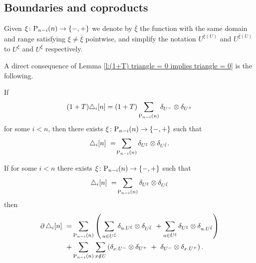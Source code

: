 \subsection{Boundaries and coproducts}

\begin{notation}
	Given $\xi \colon \P_{n-i}(n) \to \{-, +\}$ we denote by $\bar{\xi}$ the function with the same domain and range satisfying $\xi \neq \bar{\xi}$ pointwise, and simplify the notation $U^{\xi(U)}$ and $U^{\bar{\xi}(U)}$ to $U^\xi$ and $U^{\bar{\xi}}$ respectively.
\end{notation}

A direct consequence of Lemma \ref{l:(1+T) triangle = 0 implies triangle = 0} is the following.

\begin{lemma} \label{lemma: (1+T) triangle = (1+T) sum implies triangle = sum}
    If
    \[
    (1 + T) \triangle_i  [n] =
    (1 + T) \sum_{\P_{n-i}(n)} \delta_{U^-} \ot \delta_{U^+}
    \]
    for some $i < n$, then there exists $\xi \colon \P_{n-i}(n) \to \{-, +\}$  such that
    \[
    \triangle_i  [n]\ =\! \sum_{\P_{n-i}(n)} \delta_{U^{\xi}} \ot \delta_{U^{\bar{\xi}}}.
    \]
\end{lemma}


\begin{lemma} \label{lemma: boundary of triangle}
	If for some $i < n$ there exists $\xi \colon \P_{n-i}(n) \to \{-, +\}$ such that
	\[
	\triangle_i [n]\ =\! \sum_{\P_{n-i}(n)} \delta_{U^{\xi}} \ot \delta_{U^{{\bar{\xi}}}}
	\]
	then
	\begin{align}
	\label{equation: boundary of triangle}
	\bd \triangle_i [n]\ = &
	\sum_{\P_{n-i}(n)} \left( \, \sum_{u \in U^{\bar{\xi}}} \delta_{u.U^\xi} \tensor \delta_{U^{\bar{\xi}}} \ +
	\sum_{u \in U^\xi} \delta_{U^\xi} \tensor \delta_{u.U^{\bar{\xi}}} \right) \\ + &
	\sum_{\P_{n-i}(n)} \sum_{x \notin U} \left( \delta_{x.U^-} \tensor \delta_{U^+}\ +\ \delta_{U^-} \tensor \delta_{x.U^+} \right).
	\end{align}
\end{lemma}

